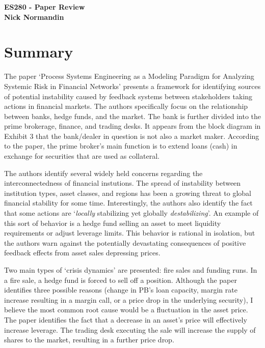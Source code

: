 \documentclass{article}
\begin{document}
\noindent
\textbf{ES280 - Paper Review} \\
\textbf{Nick Normandin} \\

\doublespacing

\section{Summary}%
\label{sec:Summary}

The paper `Process Systems Engineering as a Modeling Paradigm for Analyzing Systemic Risk in Financial Networks' presents a framework for identifying sources of potential instability caused by feedback systems between stakeholders taking actions in financial markets. The authors specifically focus on the relationship between banks, hedge funds, and the market. The bank is further divided into the prime brokerage, finance, and trading desks. It appears from the block diagram in
Exhibit 3 that the bank/dealer in question is not also a market maker. According to the paper, the prime broker's main function is to extend loans (cash) in exchange for securities that are used as collateral. 

The authors identify several widely held concerns regarding the interconnectedness of financial instutions. The spread of instability between institution types, asset classes, and regions has been a growing threat to global financial stability for some time. Interestingly, the authors also identify the fact that some actions are `\emph{locally} stabilizing yet globally \emph{destabilizing}'. An example of this sort of behavior is a hedge fund selling an asset to meet liquidity
requirements or adjust leverage limits. This behavior is rational in isolation, but the authors warn against the potentially devastating consequences of positive feedback effects from asset sales depressing prices.

Two main types of `crisis dynamics' are presented: fire sales and funding runs. In a fire sale, a hedge fund is forced to sell off a position. Although the paper identifies three possible reasons (change in PB's loan capacity, margin rate increase resulting in a margin call, or a price drop in the underlying security), I believe the most common root cause would be a fluctuation in the asset price. The paper identifies the fact that a decrease in an asset's price will effectively
increase leverage. The trading desk executing the sale will increase the supply of shares to the market, resulting in a further price drop. 
\end{document}
